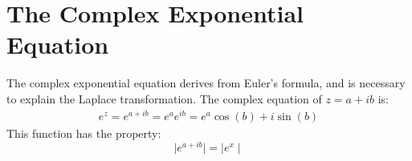 \section{The Complex Exponential Equation}
The complex exponential equation derives from Euler’s formula, and is necessary to explain the Laplace transformation. 
The complex equation of $z=a+ib$ is:
\begin{align}
e^z=e^{a+ib}=e^ae^{ib}=e^a\cos(b)+i\sin(b)
\end{align}
This function has the property:
$$\mid e^{a+ib} \mid = \mid e^x \mid$$